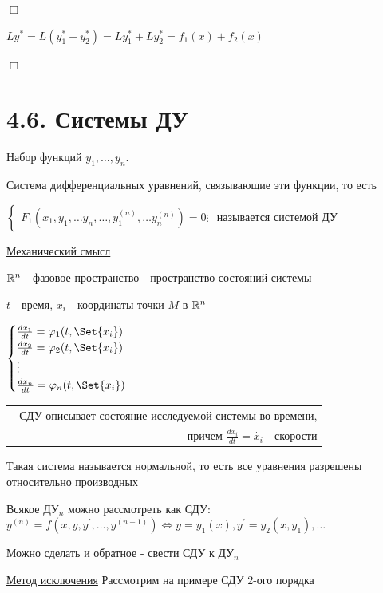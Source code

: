 \documentclass[12pt]{article}
\begin{document}
    $\Box$

    $Ly^* = L(y^*_1 + y^*_2) = Ly^*_1 + Ly^*_2 = f_1(x) + f_2(x)$

    $\Box$

    \section{4.6. Системы ДУ}

    \Def Набор функций $y_1, \dots, y_n$.

    Система дифференциальных уравнений, связывающие эти функции, то есть

    $\begin{cases}
         F_1(x_1, y_1, \dots y_n, \dots, y_1^{(n)}, \dots y_n^{(n)}) = 0
         \vdots
    \end{cases}$ называется системой ДУ

    \vspace{5mm}

    \underline{Механический смысл}

    $\mathbb{R}^n$ - фазовое пространство - пространство состояний системы

    $t$ - время, $x_i$ - координаты точки $M$ в $\mathbb{R}^n$

    $\begin{cases}
         \frac{dx_1}{dt} = \varphi_1(t, \Set{x_i}) \\
         \frac{dx_2}{dt} = \varphi_2(t, \Set{x_i}) \\
         \vdots \\
         \frac{dx_n}{dt} = \varphi_n(t, \Set{x_i}) \\
    \end{cases}$ \begin{tabular}{r} - СДУ описывает состояние исследуемой системы во времени, \\ причем $\frac{dx_i}{dt} = \dot{x_i}$ - скорости \end{tabular}

    \Nota Такая система называется нормальной, то есть все уравнения разрешены относительно производных

    \Nota Всякое ДУ$_n$ можно рассмотреть как СДУ: $y^{(n)} = f(x, y, y^\prime, \dots, y^{(n - 1)}) \Longleftrightarrow y = y_1(x), y^\prime = y_2(x, y_1), \dots$

    Можно сделать и обратное - свести СДУ к ДУ$_n$

    \underline{Метод исключения} Рассмотрим на примере СДУ 2-ого порядка
\end{document}
